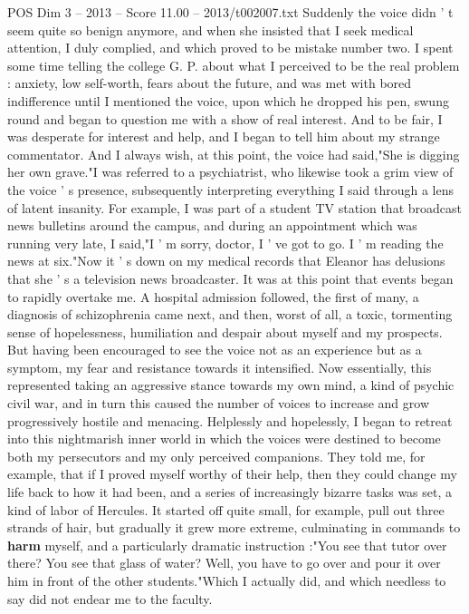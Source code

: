 \begin{textsample}{POS Dim 3 – 2013 – Score 11.00 – 2013/t002007.txt}
Suddenly the voice didn ' t seem quite so benign anymore, and when she insisted that I seek medical attention, I duly complied, and which proved to be mistake number two.
I spent some time telling the college G.
P. about what I perceived to be the real problem : anxiety, low self-worth, fears about the future, and was met with bored indifference until I mentioned the voice, upon which he dropped his pen, swung round and began to question me with a show of real interest.
And to be fair, I was desperate for interest and help, and I began to tell him about my strange commentator.
And I always wish, at this point, the voice had said,"She is digging her own grave."I was referred to a psychiatrist, who likewise took a grim view of the voice ' s presence, subsequently interpreting everything I said through a lens of latent insanity.
For example, I was part of a student TV station that broadcast news bulletins around the campus, and during an appointment which was running very late, I said,"I ' m sorry, doctor, I ' ve got to go.
I ' m reading the news at six."Now it ' s down on my medical records that Eleanor has delusions that she ' s a television news broadcaster.
It was at this point that events began to rapidly overtake me.
A hospital admission followed, the first of many, a diagnosis of schizophrenia came next, and then, worst of all, a toxic, tormenting sense of hopelessness, humiliation and despair about myself and my prospects.
But having been encouraged to see the voice not as an experience but as a symptom, my fear and resistance towards it intensified.
Now essentially, this represented taking an aggressive stance towards my own mind, a kind of psychic civil war, and in turn this caused the number of voices to increase and grow progressively hostile and menacing.
Helplessly and hopelessly, I began to retreat into this nightmarish inner world in which the voices were destined to become both my persecutors and my only perceived companions.
They told me, for example, that if I proved myself worthy of their help, then they could change my life back to how it had been, and a series of increasingly bizarre tasks was set, a kind of labor of Hercules.
It started off quite small, for example, pull out three strands of hair, but gradually it grew more extreme, culminating in commands to \textbf{harm} myself, and a particularly dramatic instruction :"You see that tutor over there?
You see that glass of water?
Well, you have to go over and pour it over him in front of the other students."Which I actually did, and which needless to say did not endear me to the faculty.

\end{textsample}
